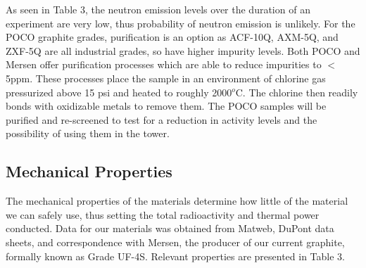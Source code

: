 \documentclass{report}
\begin{document}
As seen in Table 3, the neutron emission levels over the duration of an
experiment are very low, thus probability of neutron emission is unlikely.
For the POCO graphite grades, purification is an option as ACF-10Q, AXM-5Q,
and ZXF-5Q are all industrial grades, so have higher impurity levels.
Both POCO and Mersen offer purification processes which are able to reduce
impurities to $ < $5ppm. These processes place the sample in an environment
of chlorine gas pressurized above 15 psi and heated to roughly 2000$^{o}$C.
The chlorine then readily bonds with oxidizable metals to remove them. The
POCO samples will be purified and re-screened to test for a reduction in activity
levels and the possibility of using them in the tower.

\subsection{Mechanical Properties}
The mechanical properties of the materials determine how little of the material
we can safely use, thus setting the total radioactivity and thermal power conducted.
Data for our materials was obtained from Matweb, DuPont data sheets, and
correspondence with Mersen, the producer of our current graphite, formally known
as Grade UF-4S. Relevant properties are presented in Table 3.
\end{document}

